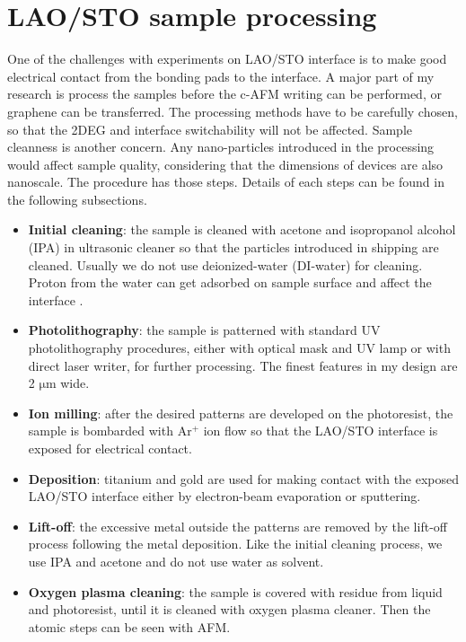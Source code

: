 \documentclass[pdflatex, sectionletters, 12pt]{pittetd}    %
\begin{document}
\section{LAO/STO sample processing}

One of the challenges with experiments on LAO/STO interface is to make good electrical contact from the bonding pads to the interface. A major part of my research is process the samples before the c-AFM writing can be performed, or graphene can be transferred. The processing methods have to be carefully chosen, so that the 2DEG and interface switchability will not be affected. Sample cleanness is another concern. Any nano-particles introduced in the processing would affect sample quality, considering that the dimensions of devices are also nanoscale. The procedure has those steps. Details of each steps can be found in the following subsections.

\begin{itemize}
	
	\item \textbf{Initial cleaning}: the sample is cleaned with acetone and isopropanol alcohol (IPA) in ultrasonic cleaner so that the particles introduced in shipping are cleaned. Usually we do not use deionized-water (DI-water) for cleaning. Proton from the water can get adsorbed on sample surface and affect the interface \cite{}.
	
	\item \textbf{Photolithography}: the sample is patterned with standard UV photolithography procedures, either with optical mask and UV lamp or with direct laser writer, for further processing. The finest features in my design are 2 $\mathrm{\mu}$m wide.
	
	\item \textbf{Ion milling}: after the desired patterns are developed on the photoresist, the sample is bombarded with Ar$^+$ ion flow so that the LAO/STO interface is exposed for electrical contact.
	
	\item \textbf{Deposition}: titanium and gold are used for making contact with the exposed LAO/STO interface either by electron-beam evaporation or sputtering.
	
	\item \textbf{Lift-off}: the excessive metal outside the patterns are removed by the lift-off process following the metal deposition. Like the initial cleaning process, we use IPA and acetone and do not use water as solvent.
	
	\item \textbf{Oxygen plasma cleaning}: the sample is covered with residue from liquid and photoresist, until it is cleaned with oxygen plasma cleaner. Then the atomic steps can be seen with AFM.
	
\end{itemize}
	
\end{document}
